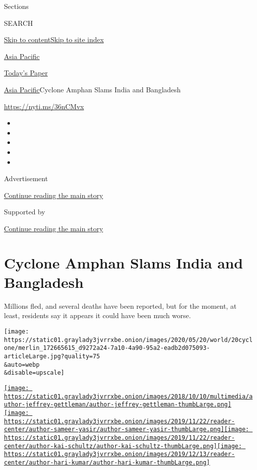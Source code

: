 Sections

SEARCH

\protect\hyperlink{site-content}{Skip to
content}\protect\hyperlink{site-index}{Skip to site index}

\href{https://www.nytimes3xbfgragh.onion/section/world/asia}{Asia
Pacific}

\href{https://myaccount.nytimes3xbfgragh.onion/auth/login?response_type=cookie\&client_id=vi}{}

\href{https://www.nytimes3xbfgragh.onion/section/todayspaper}{Today's
Paper}

\href{/section/world/asia}{Asia Pacific}\textbar{}Cyclone Amphan Slams
India and Bangladesh

\url{https://nyti.ms/36nCMvx}

\begin{itemize}
\item
\item
\item
\item
\item
\end{itemize}

Advertisement

\protect\hyperlink{after-top}{Continue reading the main story}

Supported by

\protect\hyperlink{after-sponsor}{Continue reading the main story}

\hypertarget{cyclone-amphan-slams-india-and-bangladesh}{%
\section{Cyclone Amphan Slams India and
Bangladesh}\label{cyclone-amphan-slams-india-and-bangladesh}}

Millions fled, and several deaths have been reported, but for the
moment, at least, residents say it appears it could have been much
worse.

\texttt{[image: https://static01.graylady3jvrrxbe.onion/images/2020/05/20/world/20cyclone/merlin\_172665615\_d9272a24-7a10-4a90-95a2-eadb2d075093-articleLarge.jpg?quality=75\\\&auto=webp\\\&disable=upscale]}

\href{https://www.nytimes3xbfgragh.onion/by/jeffrey-gettleman}{\texttt{[image: https://static01.graylady3jvrrxbe.onion/images/2018/10/10/multimedia/author-jeffrey-gettleman/author-jeffrey-gettleman-thumbLarge.png]}}\href{https://www.nytimes3xbfgragh.onion/by/sameer-yasir}{\texttt{[image: https://static01.graylady3jvrrxbe.onion/images/2019/11/22/reader-center/author-sameer-yasir/author-sameer-yasir-thumbLarge.png]}}\href{https://www.nytimes3xbfgragh.onion/by/kai-schultz}{\texttt{[image: https://static01.graylady3jvrrxbe.onion/images/2019/11/22/reader-center/author-kai-schultz/author-kai-schultz-thumbLarge.png]}}\href{https://www.nytimes3xbfgragh.onion/by/hari-kumar}{\texttt{[image: https://static01.graylady3jvrrxbe.onion/images/2019/12/13/reader-center/author-hari-kumar/author-hari-kumar-thumbLarge.png]}}

